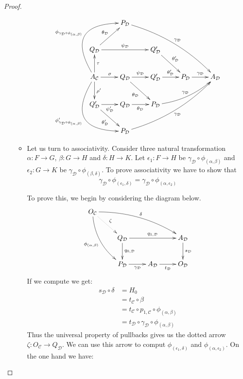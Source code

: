 \documentclass[a4paper,UKenglish,cleveref,pdftex,thm-restate,numberwithinsect]{lipics-v2021}
\def\A{\textbf {\textup{A}}}
\begin{document}
\begin{proof}
\begin{enumerate}
\begin{itemize}
			\[\xymatrix{& P_{\mathcal{D}} \ar@/^.4cm/[ddrrr]^{\gamma_{\mathcal{D}}}\\Q_{\mathcal{D}} \ar[ur]^{\theta_{\mathcal{D}}}\ar[rr]^{\psi_{\mathcal{D}}}&&Q'_{\mathcal{D}} \ar[dr]^{\theta'_{\mathcal{D}}}\\A_{\mathcal{C}} \ar[u]_{\tau} \ar[r]^{\sigma}\ar[d]^{\rho'} \ar@/_1.5cm/[ddr]_{\phi'_{\gamma_{\mathcal{D}}\circ \phi_{(\alpha, \beta)}}}\ar@/^1.5cm/[uur]^{\phi_{\gamma_{\mathcal{D}}\circ \phi_{(\alpha, \beta)}}}& Q_{\mathcal{D}} \ar[dr]_{\theta_{\mathcal{D}}} \ar[r]^{\psi_{\mathcal{D}}}& Q'_{\mathcal{D}} \ar[r]^{\theta'_{\mathcal{D}}} & P_{\mathcal{D}} \ar[r]^{\gamma_{\mathcal{D}}} & A_{\mathcal{D}}\\ Q'_{\mathcal{D}} \ar[dr]_{\theta'_{\mathcal{D}}} \ar[r]_{\psi'_{\mathcal{D}}}& Q_{\mathcal{D}} \ar[r]_{\theta_{\mathcal{D}}} & P_{\mathcal{D}} \ar@/_.3cm/[urr]^{\gamma_{\mathcal{D}}}\\ & P_{\mathcal{D}} \ar@/_.4cm/[uurrr]_{\gamma_{\mathcal{D}}}}\]
				
				\item Let us turn to associativity. Consider three natural transformation $\alpha\colon F\to G$, $\beta\colon G\to H$ and $\delta \colon H\to K$. Let $\epsilon_1\colon F\to H$ be $\gamma_{\mathcal{D}}\circ \phi_{(\alpha, \beta)}$ and $\epsilon_2\colon G\to K$ be  $\gamma_{\mathcal{D}}\circ \phi_{(\beta, \delta)}$. To prove associativity we have to show that
				\[\gamma_{\mathcal{D}}\circ \phi_{(\epsilon_1, \delta)}=\gamma_{\mathcal{D}}\circ \phi_{(\alpha, \epsilon_2)}\]
				
				
				To prove this, we begin by considering the diagram below.
							 \[\xymatrix{   O_{\mathcal{C}} \ar@/^.4cm/[drrr]^{\delta} \ar@{.>}[dr]^{\zeta}\ar@/_.4cm/[ddr]_{\phi_{(\alpha, \beta)}}\\ & Q_{\mathcal{D}} \ar[rr]^{q_{1, \mathcal{D}}}  \ar[d]^{q_{0, \mathcal{D}}} & & A_{\mathcal{D}} \ar[d]^{s_{\mathcal{D}}} \\ &   P_{\mathcal{D}} \ar[r]_{\gamma_{\mathcal{D}}}& A_{\mathcal{D}} \ar[r]_{t_{\mathcal{D}}} & O_{\mathcal{D}} }\]
				If we compute we get:
				\begin{align*}
					s_{\mathcal{D}}\circ \delta&=H_0
					\\&=t_{\mathcal{C}}\circ \beta
					\\&=t_{\mathcal{C}}\circ p_{1, \mathcal{C}}\circ \phi_{(\alpha, \beta)}
					\\&=t_{\mathcal{D}}\circ \gamma_{\mathcal{D}}\circ \phi_{(\alpha, \beta)}
				\end{align*}
				Thus the universal property of pullbacks gives us the dotted arrow $\zeta\colon O_{\mathcal{C}}\to Q_{\mathcal{D}}$. We can use this arrow to comput $\phi_{(\epsilon_1, \delta)}$ and $\phi_{(\alpha, \epsilon_2)}$. On the one hand we have:
				

\end{itemize}
\end{enumerate}
\end{proof}
\end{document}
